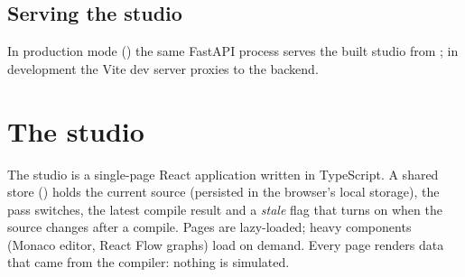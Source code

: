 \subsection{Serving the studio}
In production mode () the same FastAPI process serves the built studio from ; in development the Vite dev server proxies  to the backend.

\section{The studio}
The studio is a single-page React application written in TypeScript. A shared store () holds the current source (persisted in the browser's local storage), the pass switches, the latest compile result and a \emph{stale} flag that turns on when the source changes after a compile. Pages are lazy-loaded; heavy components (Monaco editor, React Flow graphs) load on demand. Every page renders data that came from the compiler: nothing is simulated.

